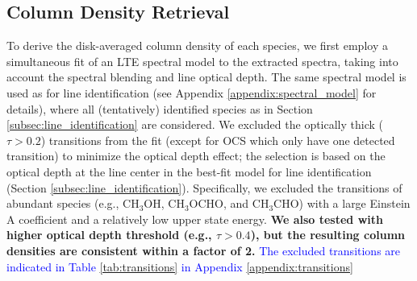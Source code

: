 \documentclass[linenumbers, twocolumn, twocolappendix, astrosymb, times]{aastex631}
\newcommand{\methanol}{CH$_3$OH\xspace}
\newcommand{\acetaldehyde}{CH$_3$CHO\xspace}
\newcommand{\methylformate}{CH$_3$OCHO\xspace}
\begin{document}
\subsection{Column Density Retrieval}\label{subsec:spectral_fit}
To derive the disk-averaged column density of each species, we first employ a simultaneous fit of an LTE spectral model to the extracted spectra, taking into account the spectral blending and line optical depth. The same spectral model is used as for line identification (see Appendix \ref{appendix:spectral_model} for details), where all (tentatively) identified species as in Section \ref{subsec:line_identification} are considered. We excluded the optically thick ($\tau > 0.2$) transitions from the fit (except for OCS which only have one detected transition) to minimize the optical depth effect; the selection is based on the optical depth at the line center in the best-fit model for line identification (Section \ref{subsec:line_identification}). Specifically, we excluded the transitions of abundant species (e.g., \methanol, \methylformate, and \acetaldehyde) with a large Einstein A coefficient and a relatively low upper state energy. \textbf{We also tested with higher optical depth threshold (e.g., $\tau  > 0.4$), but the resulting column densities are consistent within a factor of 2.} \textcolor{blue}{The excluded transitions are indicated in Table \ref{tab:transitions} in Appendix \ref{appendix:transitions}}
\end{document}
